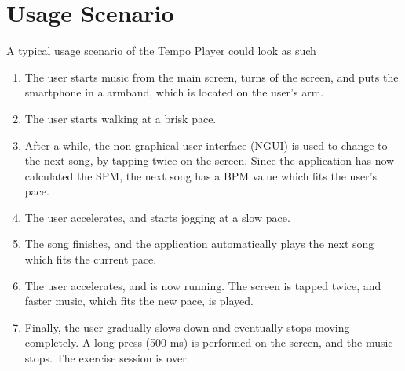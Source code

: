 \section{Usage Scenario}
A typical usage scenario of the Tempo Player could look as such

\begin{enumerate}
\item The user starts music from the main screen, turns of the screen, and puts the smartphone in a armband, which is located on the user's arm.
\item The user starts walking at a brisk pace.
\item After a while, the non-graphical user interface (NGUI) is used to change to the next song, by tapping twice on the screen.
\subitem Since the application has now calculated the SPM, the next song has a BPM value which fits the user's pace.
\item The user accelerates, and starts jogging at a slow pace.
\item The song finishes, and the application automatically plays the next song which fits the current pace.
\item The user accelerates, and is now running. The screen is tapped twice, and faster music, which fits the new pace, is played.
\item Finally, the user gradually slows down and eventually stops moving completely. A long press (500 ms) is performed on the screen, and the music stops. The exercise session is over.
\end{enumerate}